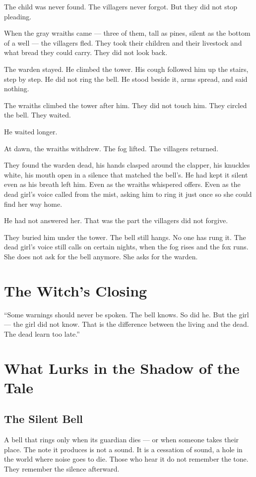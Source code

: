 The child was never found. The villagers never forgot. But they did not stop pleading.

When the gray wraiths came --- three of them, tall as pines, silent as the bottom of a well --- the villagers fled. They took their children and their livestock and what bread they could carry. They did not look back.

The warden stayed. He climbed the tower. His cough followed him up the stairs, step by step. He did not ring the bell. He stood beside it, arms spread, and said nothing.

The wraiths climbed the tower after him. They did not touch him. They circled the bell. They waited.

He waited longer.

At dawn, the wraiths withdrew. The fog lifted. The villagers returned.

They found the warden dead, his hands clasped around the clapper, his knuckles white, his mouth open in a silence that matched the bell's. He had kept it silent even as his breath left him. Even as the wraiths whispered offers. Even as the dead girl's voice called from the mist, asking him to ring it just once so she could find her way home.

He had not answered her. That was the part the villagers did not forgive.

They buried him under the tower. The bell still hangs. No one has rung it. The dead girl's voice still calls on certain nights, when the fog rises and the fox runs. She does not ask for the bell anymore. She asks for the warden.

\section*{The Witch's Closing}
``Some warnings should never be spoken. The bell knows. So did he. But the girl --- the girl did not know. That is the difference between the living and the dead. The dead learn too late.''

\section*{What Lurks in the Shadow of the Tale}

\subsection*{The Silent Bell}

A bell that rings only when its guardian dies --- or when someone takes their place. The note it produces is not a sound. It is a cessation of sound, a hole in the world where noise goes to die. Those who hear it do not remember the tone. They remember the silence afterward.

